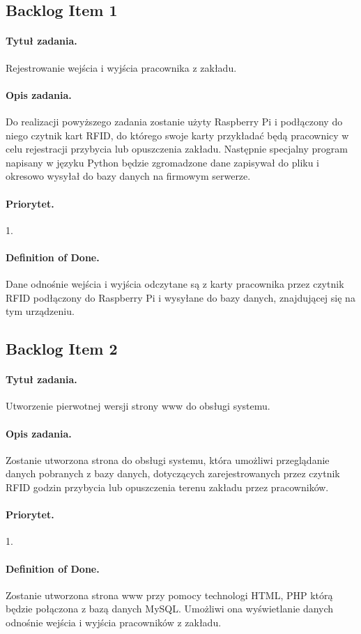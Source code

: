 \documentclass[a4paper]{article}
\begin{document}
\subsection{Backlog Item 1}
\paragraph{Tytuł zadania.} Rejestrowanie wejścia i wyjścia pracownika z zakładu.
\paragraph{Opis zadania.} Do realizacji powyższego zadania zostanie użyty Raspberry Pi i podłączony do niego czytnik kart RFID, do którego swoje karty przykładać będą pracownicy w celu rejestracji przybycia lub opuszczenia zakładu. Następnie specjalny program napisany w języku Python będzie zgromadzone dane zapisywał do pliku i okresowo wysyłał do bazy danych na firmowym serwerze.
\paragraph{Priorytet.} 1.
\paragraph{Definition of Done.} Dane odnośnie wejścia i wyjścia odczytane są z karty pracownika przez czytnik RFID podłączony do Raspberry Pi i wysyłane do bazy danych, znajdującej się na tym urządzeniu.

\subsection{Backlog Item 2}
\paragraph{Tytuł zadania.} Utworzenie pierwotnej wersji strony www do obsługi systemu.
\paragraph{Opis zadania.} Zostanie utworzona strona do obsługi systemu, która umożliwi przeglądanie danych pobranych z bazy danych, dotyczących zarejestrowanych przez czytnik RFID godzin przybycia lub opuszczenia terenu zakładu przez pracowników.
\paragraph{Priorytet.} 1.
\paragraph{Definition of Done.} Zostanie utworzona strona www przy pomocy technologi HTML, PHP którą będzie połączona z bazą danych MySQL. Umożliwi ona wyświetlanie danych odnośnie wejścia i wyjścia pracowników z zakładu.
\end{document}
